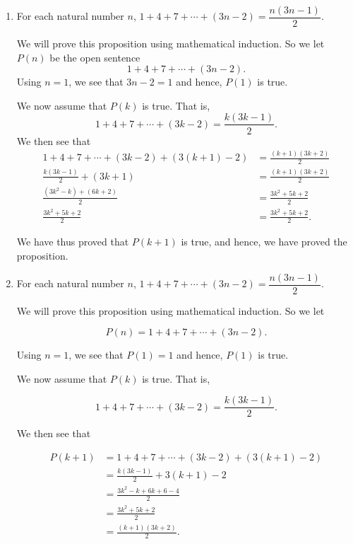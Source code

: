 \begin{enumerate}
\begin{enumerate}
\item For each natural number $n$, $1 + 4 + 7 + \cdots + \left( 3n - 2 \right) = 
\dfrac{n \left(3n - 1 \right)}{2}$.

\begin{myproof}
We will prove this proposition using mathematical induction.  So we let $P ( n )$ be the open sentence
\[
1 + 4 + 7 + \cdots + \left( 3n - 2 \right)\!.
\]
Using $n = 1$, we see that $3n - 2 = 1$ and hence, $P \left( 1 \right)$ is true.

We now assume that $P( k )$ is true.  That is, 
\[
1 + 4 + 7 + \cdots + \left( 3k - 2 \right) = \frac{k \left(3k -1 \right)}{2} .
\]
We then see that
\[
\begin{aligned}
1 + 4 + 7 + \cdots + \left( 3k - 2 \right) + \left( 3 (k + 1) - 2 \right) &= 
    \frac{\left(k + 1 \right) \left(3k + 2 \right)}{2} \\
\frac{k \left(3k -1 \right)}{2} + \left(3k + 1 \right) &= \frac{\left(k + 1 \right) \left(3k + 2 \right)}{2} \\
\frac{\left(3k^2 - k \right) + \left(6k + 2 \right) }{2} &= \frac{3k^2 + 5k + 2}{2} \\
\frac{3k^2 +5k + 2}{2} &=  \frac{3k^2 + 5k + 2}{2}.        
\end{aligned}
\]

We have thus proved that $P( k + 1 )$ is true, and hence, we have proved the proposition.
\end{myproof}


\item For each natural number $n$, $1 + 4 + 7 + \cdots + \left( 3n - 2 \right) = 
\dfrac{n \left(3n - 1 \right)}{2}$.

\begin{myproof}
We will prove this proposition using mathematical induction.  So we let

\[
P( n ) = 1 + 4 + 7 + \cdots + \left( 3n - 2 \right)\!.
\]

Using $n = 1$, we see that $P( 1 ) = 1$ and hence, $P( 1 )$ is true.

We now assume that $P( k )$ is true.  That is, 

\[
1 + 4 + 7 + \cdots + \left( 3k - 2 \right) = \frac{k \left(3k -1 \right)}{2} .
\]

We then see that

\[
\begin{aligned}
P( k + 1 ) &= 1 + 4 + 7 + \cdots + \left( 3k - 2 \right) + \left( 3 (k + 1) - 2 \right) \\
                       &= \frac{k \left( 3k - 1 \right)}{2} + 3 \left(k + 1 \right) - 2 \\
                       &= \frac{3k^2 - k + 6k + 6 - 4}{2} \\
                       &= \frac{3k^2 + 5k + 2}{2} \\
                       &= \frac{\left(k + 1 \right) \left(3k + 2 \right)}{2}.
\end{aligned}
\]


\end{myproof}
\end{enumerate}
\end{enumerate}
